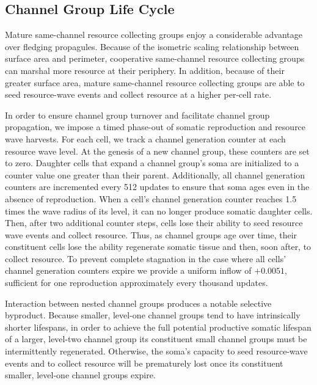 \subsection{Channel Group Life Cycle}

Mature same-channel resource collecting groups enjoy a considerable advantage over fledging propagules.
Because of the isometric scaling relationship between surface area and perimeter, cooperative same-channel resource collecting groups can marshal more resource at their periphery.
In addition, because of their greater surface area, mature same-channel resource collecting groups are able to seed resource-wave events and collect resource at a higher per-cell rate.

In order to ensure channel group turnover and facilitate channel group propagation, we impose a timed phase-out of somatic reproduction and resource wave harvests.
For each cell, we track a channel generation counter at each resource wave level.
At the genesis of a new channel group, these counters are set to zero.
Daughter cells that expand a channel group's soma are initialized to a counter value one greater than their parent.
Additionally, all channel generation counters are incremented every 512 updates to ensure that soma ages even in the absence of reproduction.
When a cell's channel generation counter reaches 1.5 times the wave radius of its level, it can no longer produce somatic daughter cells.
Then, after two additional counter steps, cells lose their ability to seed resource wave events and collect resource.
Thus, as channel groups age over time, their constituent cells lose the ability regenerate somatic tissue and then, soon after, to collect resource.
To prevent complete stagnation in the case where all cells' channel generation counters expire we provide a uniform inflow of $+0.0051$, sufficient for one reproduction approximately every thousand updates.

Interaction between nested channel groups produces a notable selective byproduct.
Because smaller, level-one channel groups tend to have intrinsically shorter lifespans, in order to achieve the full potential productive somatic lifespan of a larger, level-two channel group its constituent small channel groups must be intermittently regenerated.
Otherwise, the soma's capacity to seed resource-wave events and to collect resource will be prematurely lost once its constituent smaller, level-one channel groups expire.

